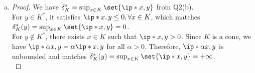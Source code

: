 \documentclass{article}
\begin{document}
\begin{solution}
\begin{enumerate}[(a)]
{            \begin{proof}
                Based on definition, we have $f^*(y) = \sup_{x\in\R^n}\set{\ip*{x, y}-f(x)}$. Construct a set $C$ which is $C = \set{y\in\R^n\mid \ip*{x, y}\leq f(x), \forall x\in\R^n}$.
                \begin{enumerate}[(i)]
                    \item For $y\in C$, we have $\ip*{x, y}\leq f(x)$ for all $x\in\R^n$ and thus $\ip*{x, y}-f(x)\leq 0$. By positively homogeneous $f(0)=0$, and we know $\ip*{0, y}=0$. So $0$ is attainable in the supremum. Therefore, $f^*(y) = \sup_{x\in\R^n}\set{\ip*{x, y}-f(x)}= 0$.
                    \item For $y\notin C$, there exists $x\in\R^n$ such that $\ip*{x, y}>f(x)$. Since $f$ is positively homogeneous, we have $\ip*{\alpha x, y}>f(\alpha x)=\alpha f(x)$ for all $\alpha>0$. Therefore, $\ip*{\alpha x, y}-f(\alpha x)=\alpha (\ip*{x, y}-f(x))$. This means for a given $y\notin C$, we can scale $x$ by arbitrary $\alpha\geq 0$ and the supremum will be unbounded. Therefore, $f^*(y)=\sup_{x\in\R^n}\set{\ip*{x, y}-f(x)}=+\infty$.
                \end{enumerate}
                The above two terms show the $f^*$ is the indicator function of $C$. Now we need to show $C$ is closed and convex to finish the proof.
                \begin{enumerate}[resume*]
                    \item For any $y_1, y_2\in C$ and $\lambda\in[0,1]$, we have $\ip*{x, \lambda y_1+(1-\lambda)y_2}\leq\lambda f(x)+(1-\lambda)f(x)$ for all $x\in\R^n$. Therefore, $\lambda y_1+(1-\lambda)y_2\in C$ and $C$ is convex. The continuity of $\ip*{\cdot, \cdot}$ implies $C$ is closed.
                \end{enumerate}
            \end{proof}
        }
        \item {
            \begin{proof}
                We have $\delta_K^*=\sup_{x\in K}\set{\ip*{x, y}}$ from Q2(b).\\
                For $y\in K^*$, it satisfies $\ip*{x, y}\leq 0, \forall x\in K$, which matches $\delta_K^*(y)=\sup_{x\in K}\set{\ip*{x, y}}=0$. \\
                For $y\notin K^*$, there exists $x\in K$ such that $\ip*{x, y}>0$. Since $K$ is a cone, we have $\ip*{\alpha x, y}=\alpha\ip*{x, y}$ for all $\alpha>0$. Therefore, $\ip*{\alpha x, y}$ is unbounded and matches $\delta_K^*(y)=\sup_{x\in K}\set{\ip*{x, y}}=+\infty$. \\
            \end{proof}
        }
    \end{enumerate}
\end{solution}
\end{document}
